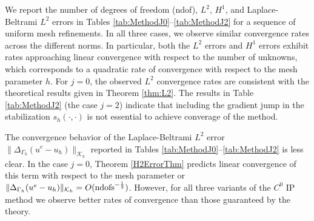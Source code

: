 \documentclass[10pt, a4paper]{amsart}
\newcommand{\calK}{\mathcal{K}}
\theoremstyle{definition}
\theoremstyle{remark}
\theoremstyle{example}
\numberwithin{equation}{section}
\begin{document}
We report the number of degrees of freedom (ndof), $L^2$, $H^1$, and Laplace-Beltrami $L^2$
errors in Tables \ref{tab:MethodJ0}--\ref{tab:MethodJ2}
for a sequence of uniform mesh refinements.
In all three cases, we observe
similar convergence rates across the different norms.
In particular,
both the $L^2$ errors and $H^1$ errors exhibit rates
approaching linear convergence 
with respect to the number of unknowns, which corresponds
to a quadratic rate of convergence with respect to the mesh parameter $h$.
For $j=0$, the observed $L^2$ convergence rates are consistent with
the theoretical results
given in Theorem \ref{thm:L2}. The results in Table \ref{tab:MethodJ2} (the case $j=2$) 
indicate that including the gradient jump in the stabilization $s_h(\cdot,\cdot)$
is not essential to achieve converage of the method.

The convergence behavior of the Laplace-Beltrami $L^2$ error
$\|\Delta_{\Gamma_h}(u^e - u_h)\|_{\calK_h}$ reported in
Tables \ref{tab:MethodJ0}--\ref{tab:MethodJ2}
is less clear. In the case $j=0$, Theorem \ref{H2ErrorThm} predicts
linear convergence of this term with respect to the mesh parameter 
or $\|\Delta_{\Gamma_h}(u^e - u_h)\|_{\calK_h} = O({\rm ndofs}^{-\frac12})$.
However, for all three variants of the $C^0$ IP method
we observe better rates of convergence than those guaranteed
by the theory.



\end{document}

